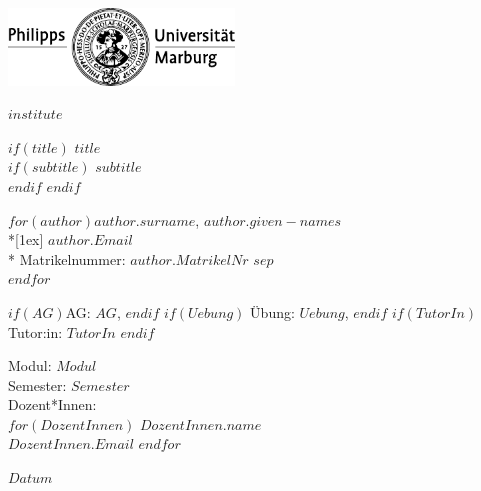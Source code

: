



\pagestyle{scrheadings}

  \clearscrheadfoot
  \ihead[]{\headmark} %
  \chead[]{} %
  \ohead{} %
  \ofoot[]{\pagemark} %
  \setheadsepline{.2pt}
  \setfootsepline{.2pt}



\begin{titlepage}
\sffamily
\setlength\parindent{0pt}

\includegraphics[width = 6cm]{images/pum_logo_sw.pdf} \par
\vspace{-.9cm} \hfill{\huge \bfseries $institute$}

\vfill
\vfill

$if(title)$
{\huge \bfseries $title$} \\[1ex]
$if(subtitle)$
{\Large \bfseries $subtitle$} \\[1cm]
$endif$
$endif$


\vfill

\begin{multicols}{2}
    $for(author)$\Large $author.surname$, $author.given-names$ \\*[1ex]
    \normalsize $author.Email$\\*
    Matrikelnummer: $author.MatrikelNr$ $sep$\\[1cm]
    $endfor$
\end{multicols}

\vfill
$if(AG)$AG: $AG$,  $endif$ $if(Uebung)$ Übung: $Uebung$,  $endif$ $if(TutorIn)$ Tutor:in: $TutorIn$ $endif$

\vfill

Modul: $Modul$ \\
Semester: $Semester$ \\

Dozent*Innen: \\[1ex]
$for(DozentInnen)$ $DozentInnen.name$\\ $DozentInnen.Email$ $endfor$

\vfill

$Datum$

\end{titlepage}



